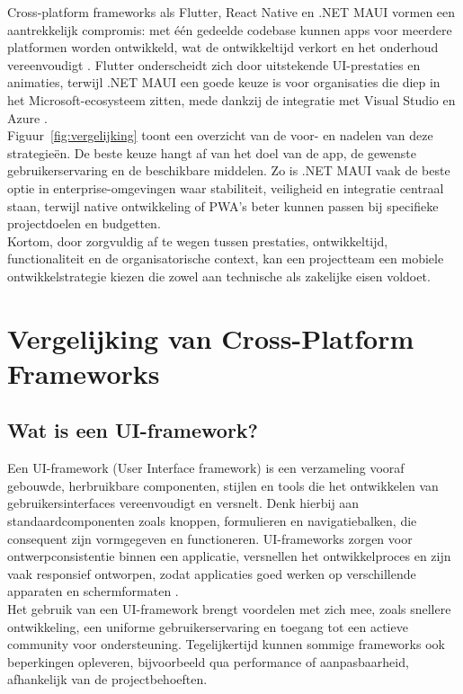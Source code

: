 Cross-platform frameworks als Flutter, React Native en .NET MAUI vormen een aantrekkelijk compromis: met één gedeelde codebase kunnen apps voor meerdere platformen worden ontwikkeld, wat de ontwikkeltijd verkort en het onderhoud vereenvoudigt \autocite{MuhammadKhanLodhi2023}. Flutter onderscheidt zich door uitstekende UI-prestaties en animaties, terwijl .NET MAUI een goede keuze is voor organisaties die diep in het Microsoft-ecosysteem zitten, mede dankzij de integratie met Visual Studio en Azure \autocite{Gajjam2025}.\\

Figuur~\ref{fig:vergelijking} toont een overzicht van de voor- en nadelen van deze strategieën. De beste keuze hangt af van het doel van de app, de gewenste gebruikerservaring en de beschikbare middelen. Zo is .NET MAUI vaak de beste optie in enterprise-omgevingen waar stabiliteit, veiligheid en integratie centraal staan, terwijl native ontwikkeling of PWA’s beter kunnen passen bij specifieke projectdoelen en budgetten.\\

Kortom, door zorgvuldig af te wegen tussen prestaties, ontwikkeltijd, functionaliteit en de organisatorische context, kan een projectteam een mobiele ontwikkelstrategie kiezen die zowel aan technische als zakelijke eisen voldoet.\\


\section{Vergelijking van Cross-Platform Frameworks}

\subsection{Wat is een UI-framework?}
Een UI-framework (User Interface framework) is een verzameling vooraf gebouwde, herbruikbare componenten, stijlen en tools die het ontwikkelen van gebruikersinterfaces vereenvoudigt en versnelt. Denk hierbij aan standaardcomponenten zoals knoppen, formulieren en navigatiebalken, die consequent zijn vormgegeven en functioneren. UI-frameworks zorgen voor ontwerpconsistentie binnen een applicatie, versnellen het ontwikkelproces en zijn vaak responsief ontworpen, zodat applicaties goed werken op verschillende apparaten en schermformaten \autocite{JohanFabry2017}.\\

Het gebruik van een UI-framework brengt voordelen met zich mee, zoals snellere ontwikkeling, een uniforme gebruikerservaring en toegang tot een actieve community voor ondersteuning. Tegelijkertijd kunnen sommige frameworks ook beperkingen opleveren, bijvoorbeeld qua performance of aanpasbaarheid, afhankelijk van de projectbehoeften.\\

